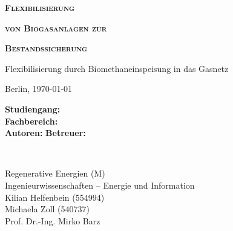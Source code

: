 \begin{titlepage}
	\begin{center}
		
		\vspace*{1cm}
		
		\textbf{\textsc{{\huge Flexibilisierung}}}
		
		\vspace{0.3cm}

		\textbf{\textsc{{\huge von Biogasanlagen zur}}}
		
		\vspace{0.3cm}

		\textbf{\textsc{{\huge Bestandssicherung}}}
 
		\vspace{0.5cm}

		{\Large Flexibilisierung durch Biomethaneinspeisung in das Gasnetz}
 
		\vspace{2cm}
		
		Berlin, \today
       
       
 
		\vspace{2cm}
		
		\begin{minipage}{0.4\textwidth}
			\begin{flushleft}
				\textbf{Studiengang:}\\
				\textbf{Fachbereich:}\\
				\textbf{Autoren:}\newline\newline
				\textbf{Betreuer:}\\
			\end{flushleft}
		\end{minipage}~
		\begin{minipage}{0.4\textwidth}            
			\begin{flushright}
				Regenerative Energien (M)\\
				Ingenieurwissenschaften – Energie und Information\\
				Kilian Helfenbein (554994)\\
				Michaela Zoll (540737)\\ 
				Prof. Dr.-Ing. Mirko Barz\\
			\end{flushright}        
		\end{minipage}\\[2 cm]
		
		\vfill
 
		\begin{minipage}{0.8\textwidth}
			
		\end{minipage}~
		
	\end{center}
\end{titlepage}